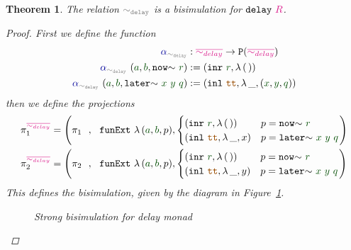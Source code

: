 \documentclass[twoside,11pt,openright]{report}
\theoremstyle{plain} %
\newtheorem{thm}{Theorem}[section]
\theoremstyle{definition}
\theoremstyle{remark}
\newcommand*{\figref}[1]{Figure~\ref{fig:#1}}
\newcommand*{\term}[1]{\textcolor{green!30!black}{#1}} %
\newcommand*{\type}[1]{\textcolor{magenta!90!black}{#1}}
\newcommand*{\coalg}[2]{#1\texttt{-}#2}
\newcommand*{\relation}[1]{\textcolor{gray}{\ensuremath{\mathtt{#1}}}}
\newcommand*{\constant}[1]{\textcolor{orange!60!black}{\ensuremath{\mathtt{#1}}}}
\newcommand*{\function}[1]{\textcolor{blue!60!black}{\ensuremath{\mathtt{#1}}}}
\newcommand*{\typeformer}[1]{\ensuremath{\mathtt{#1}}}
\newcommand*{\functor}[1]{\ensuremath{\mathbf{\mathtt{#1}}}}
\begin{document}
\begin{thm}
  The relation \(\relation{\sim_{delay}}\) is a bisimulation for \(\typeformer{delay}~\type{R}\).
  \begin{proof}
    First we define the function
    \begin{equation}
      \begin{aligned}
        \function{\alpha}_{\relation{\sim_{delay}}} &: \type{\overline{\sim_{delay}}} \rightarrow \functor{P} (\type{\overline{\sim_{delay}}}) \\
        \function{\alpha}_{\relation{\sim_{delay}}}~(\term{a} , \term{b} , \mathtt{now}{\sim}~\term{r}) &:= (\mathtt{inr}~\term{r} , \lambda\,(\,)) \\
        \function{\alpha}_{\relation{\sim_{delay}}}~(\term{a} , \term{b} , \mathtt{later}{\sim}~\term{x}~\term{y}~\term{q}) &:= (\mathtt{inl}~\constant{tt} , \lambda\,\_, (\term{x} , \term{y} , \term{q}))
      \end{aligned}
    \end{equation}
    then we define the projections
      \begin{align}
        \pi_1^{\type{\overline{\sim_{delay}}}} &= \left( \pi_1 ~~ , ~~ \texttt{funExt}~\lambda\,(\term{a},\term{b},p), \begin{cases} (\mathtt{inr}~\term{r} , \lambda\,(\,)) & p = \mathtt{now}{\sim}~\term{r} \\ (\mathtt{inl}~\constant{tt} , \lambda\,\_, x) & p = \mathtt{later}{\sim}~\term{x}~\term{y}~\term{q}\end{cases} \right) \\
        \pi_2^{\type{\overline{\sim_{delay}}}} &= \left( \pi_2 ~~ , ~~ \texttt{funExt}~\lambda\,(\term{a},\term{b},p), \begin{cases} (\mathtt{inr}~\term{r} , \lambda\,(\,)) & p = \mathtt{now}{\sim}~\term{r} \\ (\mathtt{inl}~\constant{tt} , \lambda\,\_, y) & p = \mathtt{later}{\sim}~\term{x}~\term{y}~\term{q}\end{cases} \right) \\
      \end{align}
      This defines the bisimulation, given by the diagram in \figref{delay-strong-bisim}.
      \begin{figure}[h]
        \centering
        \caption{Strong bisimulation for delay monad}
        \label{fig:delay-strong-bisim}
      \end{figure}
  \end{proof}
\end{thm}
\end{document}
